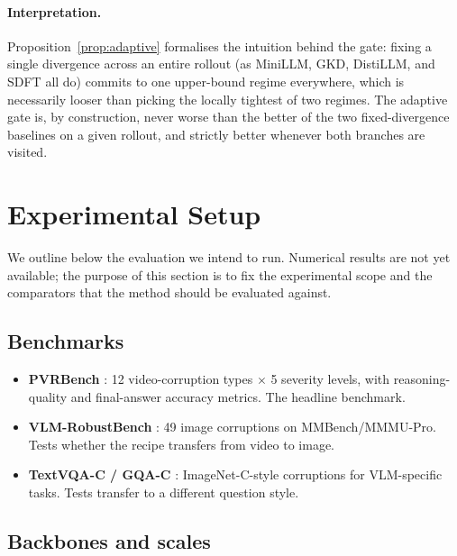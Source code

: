 \documentclass{article}
\begin{document}
\paragraph{Interpretation.}
Proposition~\ref{prop:adaptive} formalises the intuition behind the gate: fixing a single divergence across an entire rollout (as MiniLLM, GKD, DistiLLM, and SDFT all do) commits to one upper-bound regime everywhere, which is necessarily looser than picking the locally tightest of two regimes. The adaptive gate is, by construction, never worse than the better of the two fixed-divergence baselines on a given rollout, and strictly better whenever both branches are visited.

\section{Experimental Setup}
\label{sec:exp}

We outline below the evaluation we intend to run. Numerical results are not yet available; the purpose of this section is to fix the experimental scope and the comparators that the method should be evaluated against.

\subsection{Benchmarks}

\begin{itemize}[leftmargin=*,nosep]
\item \textbf{PVRBench} \citep{he2026rova}: 12 video-corruption types $\times$ 5 severity levels, with reasoning-quality and final-answer accuracy metrics. The headline benchmark.
\item \textbf{VLM-RobustBench} \citep{vlmrobustbench2026}: 49 image corruptions on MMBench/MMMU-Pro. Tests whether the recipe transfers from video to image.
\item \textbf{TextVQA-C / GQA-C} \citep{analysingvlm2025}: ImageNet-C-style corruptions for VLM-specific tasks. Tests transfer to a different question style.
\end{itemize}

\subsection{Backbones and scales}
\end{document}
